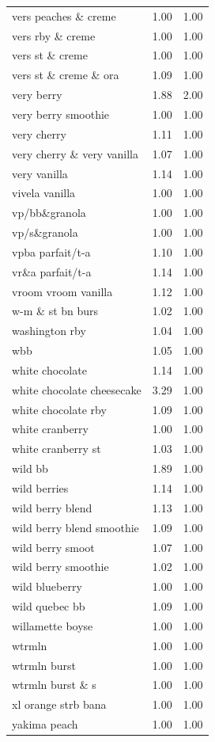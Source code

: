 \begin{table}
\begin{tabular}{lrr}
vers peaches \& creme & 1.00 & 1.00 \\
vers rby \& creme & 1.00 & 1.00 \\
vers st \& creme & 1.00 & 1.00 \\
vers st \& creme \& ora & 1.09 & 1.00 \\
very berry & 1.88 & 2.00 \\
very berry smoothie & 1.00 & 1.00 \\
very cherry & 1.11 & 1.00 \\
very cherry \& very vanilla & 1.07 & 1.00 \\
very vanilla & 1.14 & 1.00 \\
vivela vanilla & 1.00 & 1.00 \\
vp/bb\&granola & 1.00 & 1.00 \\
vp/s\&granola & 1.00 & 1.00 \\
vpba parfait/t-a & 1.10 & 1.00 \\
vr\&a parfait/t-a & 1.14 & 1.00 \\
vroom vroom vanilla & 1.12 & 1.00 \\
w-m \& st bn burs & 1.02 & 1.00 \\
washington rby & 1.04 & 1.00 \\
wbb & 1.05 & 1.00 \\
white chocolate & 1.14 & 1.00 \\
white chocolate cheesecake & 3.29 & 1.00 \\
white chocolate rby & 1.09 & 1.00 \\
white cranberry & 1.00 & 1.00 \\
white cranberry st & 1.03 & 1.00 \\
wild bb & 1.89 & 1.00 \\
wild berries & 1.14 & 1.00 \\
wild berry blend & 1.13 & 1.00 \\
wild berry blend smoothie & 1.09 & 1.00 \\
wild berry smoot & 1.07 & 1.00 \\
wild berry smoothie & 1.02 & 1.00 \\
wild blueberry & 1.00 & 1.00 \\
wild quebec bb & 1.09 & 1.00 \\
willamette boyse & 1.00 & 1.00 \\
wtrmln & 1.00 & 1.00 \\
wtrmln burst & 1.00 & 1.00 \\
wtrmln burst \& s & 1.00 & 1.00 \\
xl orange strb bana & 1.00 & 1.00 \\
yakima peach & 1.00 & 1.00 \\
\bottomrule
\end{tabular}
\end{table}
